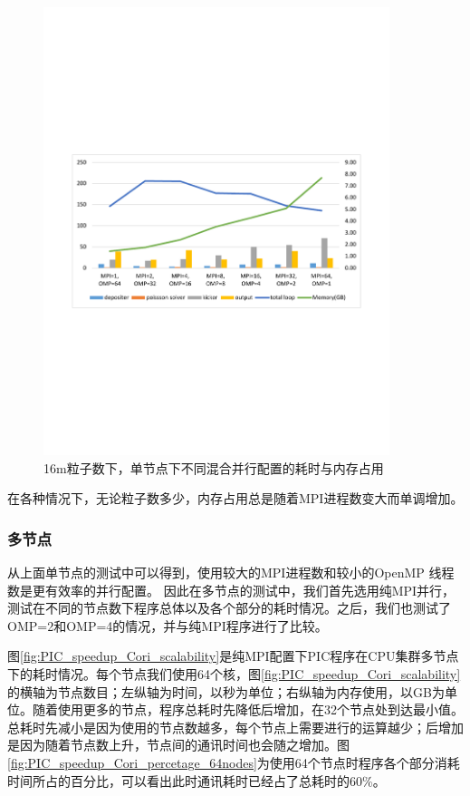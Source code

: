 \begin{figure}[!htb]
  \centering
  \includegraphics[width=0.9\textwidth]{Img/PIC_speedup_Cori_1node_16m.pdf}
  \caption{16m粒子数下，单节点下不同混合并行配置的耗时与内存占用}
  \label{fig:PIC_speedup_Cori_1node_16m}
\end{figure}

在各种情况下，无论粒子数多少，内存占用总是随着MPI进程数变大而单调增加。
\subsubsection{多节点}
从上面单节点的测试中可以得到，使用较大的MPI进程数和较小的OpenMP 线程数是更有效率的并行配置。
因此在多节点的测试中，我们首先选用纯MPI并行，测试在不同的节点数下程序总体以及各个部分的耗时情况。之后，我们也测试了OMP=2和OMP=4的情况，并与纯MPI程序进行了比较。

图\ref{fig:PIC_speedup_Cori_scalability}是纯MPI配置下PIC程序在CPU集群多节点下的耗时情况。每个节点我们使用64个核，图\ref{fig:PIC_speedup_Cori_scalability}的横轴为节点数目；左纵轴为时间，以秒为单位；右纵轴为内存使用，以GB为单位。随着使用更多的节点，程序总耗时先降低后增加，在32个节点处到达最小值。总耗时先减小是因为使用的节点数越多，每个节点上需要进行的运算越少；后增加是因为随着节点数上升，节点间的通讯时间也会随之增加。图\ref{fig:PIC_speedup_Cori_percetage_64nodes}为使用64个节点时程序各个部分消耗时间所占的百分比，可以看出此时通讯耗时已经占了总耗时的60\%。

